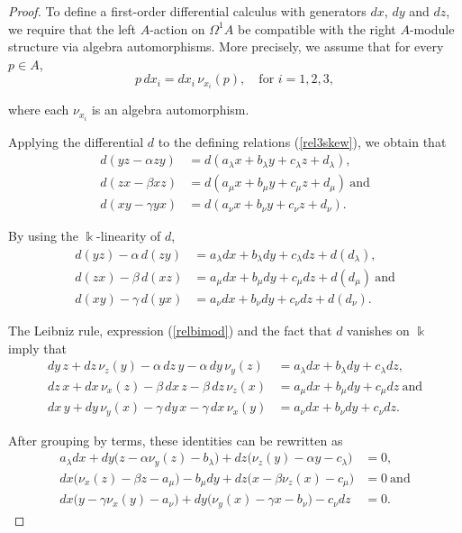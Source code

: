\documentclass{amsart}
\theoremstyle{definition}
\theoremstyle{remark}
\numberwithin{equation}{section}
\begin{document}
\begin{proof}
To define a first-order differential calculus with generators $dx$, $dy$ and $dz$, we require that the left $A$-action on $\Omega^{1}A$ be compatible with the right $A$-module structure via algebra automorphisms. More precisely, we assume that for every $p\in A$,
\begin{equation}\label{relbimod}
p\,dx_i = dx_i\,\nu_{x_i}(p), \quad \text{for } i=1,2,3,
\end{equation}

where each $\nu_{x_i}$ is an algebra automorphism.

Applying the differential $d$ to the defining relations (\ref{rel3skew}), we obtain that 
\begin{align*}
d(yz-\alpha zy) & =d(a_{\lambda}x+b_{\lambda}y+c_{\lambda}z+d_{\lambda}), \\
d(zx-\beta xz) & =d(a_{\mu}x+b_{\mu}y+c_{\mu}z+d_{\mu}) \ \text{and} \\
d(xy-\gamma yx) & = d(a_{\nu}x+b_{\nu}y+c_{\nu}z+d_{\nu}).
\end{align*}

By using the $\Bbbk$-linearity of $d$, 
\begin{align*}
d(yz)-\alpha\, d(zy) & =a_{\lambda}dx+b_{\lambda}dy+c_{\lambda}dz+d(d_{\lambda}), \\
d(zx)-\beta\, d(xz) & =a_{\mu}dx+b_{\mu}dy+c_{\mu}dz+d(d_{\mu}) \ \text{and} \\
d(xy)-\gamma\, d(yx) & = a_{\nu}dx+b_{\nu}dy+c_{\nu}dz+d(d_{\nu}).
\end{align*}

The Leibniz rule, expression (\ref{relbimod}) and the fact that $d$ vanishes on $\Bbbk$ imply that
\begin{align*}
dy\,z+dz\,\nu_{z}(y)-\alpha\,dz\,y-\alpha\,dy\,\nu_{y}(z) & =a_{\lambda}dx+b_{\lambda}dy+c_{\lambda}dz, \\
dz\,x+dx\,\nu_{x}(z)-\beta\,dx\,z-\beta\,dz\,\nu_{z}(x) & =a_{\mu}dx+b_{\mu}dy+c_{\mu}dz \ \text{and} \\
dx\,y+dy\,\nu_{y}(x)-\gamma\,dy\,x-\gamma\,dx\,\nu_{x}(y) & = a_{\nu}dx+b_{\nu}dy+c_{\nu}dz.
\end{align*}

After grouping by terms, these identities can be rewritten as
\begin{align*}
a_{\lambda}dx+dy\big(z-\alpha\nu_{y}(z)-b_{\lambda}\big)+dz\big(\nu_{z}(y)-\alpha y-c_{\lambda}\big) & =0, \\
dx\big(\nu_{x}(z)-\beta z-a_{\mu}\big)-b_{\mu}dy+dz\big(x-\beta\nu_{z}(x)-c_{\mu}\big) & =0 \ \text{and} \\
dx\big(y-\gamma\nu_{x}(y)-a_{\nu}\big)+dy\big(\nu_{y}(x)-\gamma x-b_{\nu}\big)-c_{\nu}dz & =0.
\end{align*}


\end{proof}
\end{document}
